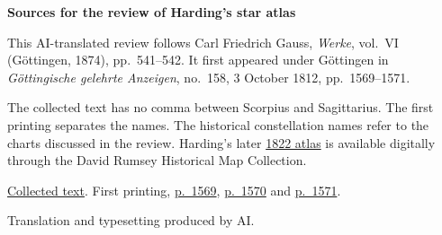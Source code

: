 \clearpage\thispagestyle{empty}
\begin{center}\textbf{Sources for the review of Harding's star atlas}\end{center}
\noindent This AI-translated review follows Carl Friedrich Gauss, \textit{Werke}, vol.~VI (Göttingen, 1874), pp.~541--542. It first appeared under Göttingen in \textit{Göttingische gelehrte Anzeigen}, no.~158, 3 October 1812, pp.~1569--1571.
\par\smallskip\noindent The collected text has no comma between Scorpius and Sagittarius. The first printing separates the names. The historical constellation names refer to the charts discussed in the review. Harding's later \href{https://www.davidrumsey.com/luna/servlet/detail/RUMSEY~8~1~372238~90138977:Title--Atlas-novus-coelestis-XXVII-}{1822 atlas} is available digitally through the David Rumsey Historical Map Collection.
\par\smallskip\noindent \href{https://gdz.sub.uni-goettingen.de/id/PPN236007467}{Collected text}. First printing, \href{https://images.p.sub.uni-goettingen.de/iiif/image/gdz:PPN319721507_1812:00001613/full/1650,/0/default.jpg}{p.~1569}, \href{https://images.p.sub.uni-goettingen.de/iiif/image/gdz:PPN319721507_1812:00001614/full/1650,/0/default.jpg}{p.~1570} and \href{https://images.p.sub.uni-goettingen.de/iiif/image/gdz:PPN319721507_1812:00001615/full/1650,/0/default.jpg}{p.~1571}.
\par\smallskip\noindent Translation and typesetting produced by AI.
\clearpage
